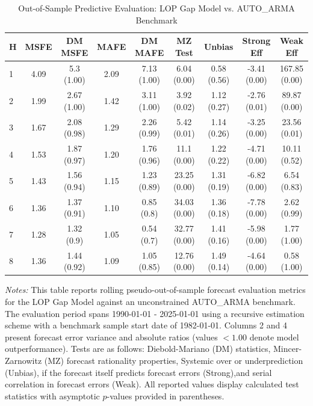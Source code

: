 \begin{table}[htbp]
\centering
\caption{Out-of-Sample Predictive Evaluation: LOP Gap Model vs. AUTO_ARMA Benchmark}
\label{tab:lop_gap_model_evaluation}
\footnotesize
\begin{tabular}{l cccccccc}
\hline\hline
\rule{0pt}{3ex}
\textbf{H} & \textbf{MSFE} & \textbf{DM MSFE} & \textbf{MAFE} & \textbf{DM MAFE} & \textbf{MZ Test} & \textbf{Unbias} & \textbf{Strong Eff} & \textbf{Weak Eff} \\[0.5ex]
\hline
\rule{0pt}{2.5ex}
1 & 4.09 & 5.3 (1.00) & 2.09 & 7.13 (1.00) & 6.04 (0.00) & 0.58 (0.56) & -3.41 (0.00) & 167.85 (0.00) \\
2 & 1.99 & 2.67 (1.00) & 1.42 & 3.11 (1.00) & 3.92 (0.02) & 1.12 (0.27) & -2.76 (0.01) & 89.87 (0.00) \\
3 & 1.67 & 2.08 (0.98) & 1.29 & 2.26 (0.99) & 5.42 (0.01) & 1.14 (0.26) & -3.25 (0.00) & 23.56 (0.01) \\
4 & 1.53 & 1.87 (0.97) & 1.20 & 1.76 (0.96) & 11.1 (0.00) & 1.22 (0.22) & -4.71 (0.00) & 10.11 (0.52) \\
5 & 1.43 & 1.56 (0.94) & 1.15 & 1.23 (0.89) & 23.25 (0.00) & 1.31 (0.19) & -6.82 (0.00) & 6.54 (0.83) \\
6 & 1.36 & 1.37 (0.91) & 1.10 & 0.85 (0.8) & 34.03 (0.00) & 1.36 (0.18) & -7.78 (0.00) & 2.62 (0.99) \\
7 & 1.28 & 1.32 (0.9) & 1.05 & 0.54 (0.7) & 32.77 (0.00) & 1.41 (0.16) & -5.98 (0.00) & 1.77 (1.00) \\
8 & 1.36 & 1.44 (0.92) & 1.09 & 1.05 (0.85) & 12.76 (0.00) & 1.49 (0.14) & -4.64 (0.00) & 0.58 (1.00) \\
\hline\hline
\end{tabular}%
\par\smallskip
\parbox{\textwidth}{\scriptsize \textit{Notes:} This table reports rolling pseudo-out-of-sample forecast evaluation metrics for the LOP Gap Model against an unconstrained AUTO_ARMA benchmark. The evaluation period spans 1990-01-01 - 2025-01-01 using a recursive estimation scheme with a benchmark sample start date of 1982-01-01. Columns 2 and 4 present forecast error variance and absolute ratios (values $< 1.00$ denote model outperformance). Tests are as follows: Diebold-Mariano (DM) statistics, Mincer-Zarnowitz (MZ) forecast rationality properties, Systemic over or underprediction (Unbias), if the forecast itself predicts forecast errors (Strong),and serial correlation in forecast errors (Weak). All reported values display calculated test statistics with asymptotic $p$-values provided in parentheses.}
\end{table}
